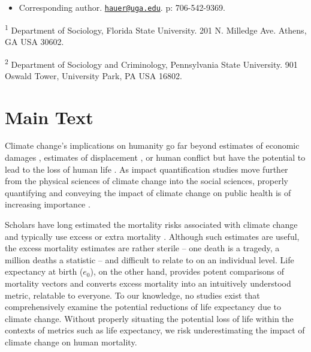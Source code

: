 \documentclass[12pt,]{article}
\providecommand{\tightlist}{%
\setlength{\itemsep}{0pt}\setlength{\parskip}{0pt}}
\begin{document}
\vskip 6.5pt


\noindent \doublespacing \begin{itemize}
\tightlist
\item
  Corresponding author.
  \href{mailto:hauer@uga.edu}{\nolinkurl{hauer@uga.edu}}. p:
  706-542-9369.
\end{itemize}

\textsuperscript{1} Department of Sociology, Florida State University.
201 N. Milledge Ave. Athens, GA USA 30602.

\textsuperscript{2} Department of Sociology and Criminology,
Pennsylvania State University. 901 Oswald Tower, University Park, PA USA
16802.

\newpage

\hypertarget{main-text}{%
\section{Main Text}\label{main-text}}

Climate change's implications on humanity go far beyond estimates of
economic damages \citep{hsiang2017estimating}, estimates of displacement
\citep{rigaud2018groundswell}, or human conflict
\citep{barnett2007climate} but have the potential to lead to the loss of
human life \citep{forzieri2017increasing, pachauri2014climate}. As
impact quantification studies move further from the physical sciences of
climate change into the social sciences, properly quantifying and
conveying the impact of climate change on public health is of increasing
importance \citep{melillo2014climate, cloyd2016engagement}.

Scholars have long estimated the mortality risks associated with climate
change and typically use excess or extra mortality
\citep{forzieri2017increasing, wilson2017climate, mcmichael2006climate, zanobetti2012summer}.
Although such estimates are useful, the excess mortality estimates are
rather sterile -- one death is a tragedy, a million deaths a statistic
-- and difficult to relate to on an individual level. Life expectancy at
birth (\(e_0\)), on the other hand, provides potent comparisons of
mortality vectors and converts excess mortality into an intuitively
understood metric, relatable to everyone. To our knowledge, no studies
exist that comprehensively examine the potential reductions of life
expectancy due to climate change. Without properly situating the
potential loss of life within the contexts of metrics such as life
expectancy, we risk underestimating the impact of climate change on
human mortality.
\end{document}
